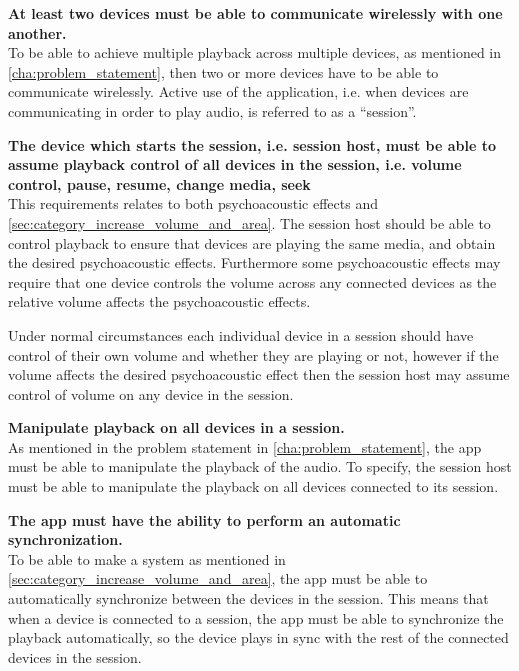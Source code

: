 \begin{eletterate}
    \item\label{req:wireless} \textbf{At least two devices must be able to communicate wirelessly with one another.} \hfill\\
        To be able to achieve multiple playback across multiple devices, as mentioned in \cref{cha:problem_statement},
        then two or more devices have to be able to communicate wirelessly.
        Active use of the application, i.e. when devices are communicating in order to play audio, is referred to as a ``session''.

    \item\label{req:host_control} \textbf{The device which starts the session, i.e. session host, must be able to assume playback control of all devices in the session, i.e. volume control, pause, resume, change media, seek} \hfill\\
        This requirements relates to both psychoacoustic effects and \cref{sec:category_increase_volume_and_area}.
        The session host should be able to control playback to ensure that devices are playing the same media, and obtain the desired psychoacoustic effects.
        Furthermore some psychoacoustic effects may require that one device controls the volume across any connected devices as the relative volume affects the psychoacoustic effects.

        Under normal circumstances each individual device in a session should have control of their own volume and whether they are playing or not, however if the volume affects the desired psychoacoustic effect then the session host may assume control of volume on any device in the session.
    
    \item\label{req:manipulate} \textbf{Manipulate playback on all devices in a session.} \hfill\\
        As mentioned in the problem statement in \cref{cha:problem_statement}, the app must be able to manipulate the playback of the audio. 
        To specify, the session host must be able to manipulate the playback on all devices connected to its session.
    
    \item\label{req:sync} \textbf{The app must have the ability to perform an automatic synchronization.} \hfill\\
        To be able to make a system as mentioned in \cref{sec:category_increase_volume_and_area}, 
        the app must be able to automatically synchronize between the devices in the session. 
        This means that when a device is connected to a session, the app must be able to synchronize the playback automatically,
        so the device plays in sync with the rest of the connected devices in the session.


\end{eletterate}
